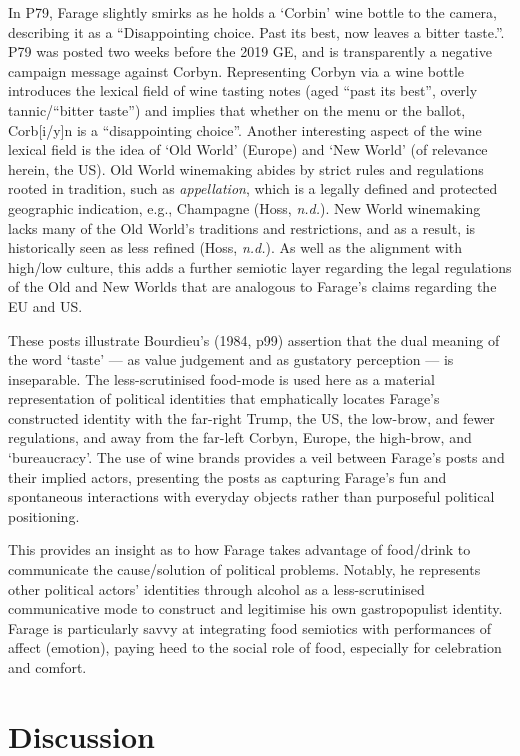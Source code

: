 \documentclass[a4paper, nobind]{templates/ociamthesis}
\begin{document}
In P79, Farage slightly smirks as he holds a `Corbin' wine bottle to the camera, describing it as a ``Disappointing choice. Past its best, now leaves a bitter taste.''.
P79 was posted two weeks before the 2019 GE, and is transparently a negative campaign message against Corbyn.
Representing Corbyn via a wine bottle introduces the lexical field of wine tasting notes (aged ``past its best'', overly tannic/``bitter taste'') and implies that whether on the menu or the ballot, Corb{[}i/y{]}n is a ``disappointing choice''.
Another interesting aspect of the wine lexical field is the idea of `Old World' (Europe) and `New World' (of relevance herein, the US).
Old World winemaking abides by strict rules and regulations rooted in tradition, such as \emph{appellation}, which is a legally defined and protected geographic indication, e.g., Champagne (Hoss, \emph{n.d.}).
New World winemaking lacks many of the Old World's traditions and restrictions, and as a result, is historically seen as less refined (Hoss, \emph{n.d.}).
As well as the alignment with high/low culture, this adds a further semiotic layer regarding the legal regulations of the Old and New Worlds that are analogous to Farage's claims regarding the EU and US.

These posts illustrate Bourdieu's (1984, p99) assertion that the dual meaning of the word `taste' --- as value judgement and as gustatory perception --- is inseparable.
The less-scrutinised food-mode is used here as a material representation of political identities that emphatically locates Farage's constructed identity with the far-right Trump, the US, the low-brow, and fewer regulations, and away from the far-left Corbyn, Europe, the high-brow, and `bureaucracy'.
The use of wine brands provides a veil between Farage's posts and their implied actors, presenting the posts as capturing Farage's fun and spontaneous interactions with everyday objects rather than purposeful political positioning.

This provides an insight as to how Farage takes advantage of food/drink to communicate the cause/solution of political problems. Notably, he represents other political actors' identities through alcohol as a less-scrutinised communicative mode to construct and legitimise his own gastropopulist identity. Farage is particularly savvy at integrating food semiotics with performances of affect (emotion), paying heed to the social role of food, especially for celebration and comfort.

\hypertarget{discussion}{%
\section{Discussion}\label{discussion}}
\end{document}
